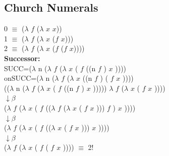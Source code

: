 \documentclass{article}
\begin{document}
\begin{flushleft}
\section*{Church Numerals}
\begin{flushleft} 
 0 $\equiv$ ($\lambda$ $\mathit{f}$ ($\lambda$ $\mathit{x}$ $\mathit{x}$))\\
 1 $\equiv$ ($\lambda$ $\mathit{f}$ ($\lambda$ $\mathit{x}$ ($\mathit{f}$ $\mathit{x}$)))\\
 2 $\equiv$ ($\lambda$ $\mathit{f}$ ($\lambda$ $\mathit{x}$ ($\mathit{f}$ ($\mathit{f}$ $\mathit{x}$))))\\
\bigskip
\textbf{Successor:}\\
SUCC=($\lambda$ n ($\lambda$  $\mathit{f}$  ($\lambda$  $\mathit{x}$  ( $\mathit{f}$  ((n  $\mathit{f}$ )  $\mathit{x}$ ))))\\
onSUCC=($\lambda$ n ($\lambda$  $\mathit{f}$  ($\lambda$  $\mathit{x}$  ((n  $\mathit{f}$ ) ( $\mathit{f}$   $\mathit{x}$ ))))\\
\bigskip
(($\lambda$ n ($\lambda$  $\mathit{f}$  ($\lambda$  $\mathit{x}$  ( $\mathit{f}$  ((n  $\mathit{f}$ )  $\mathit{x}$ ))))) $\lambda$  $\mathit{f}$  ($\lambda$  $\mathit{x}$  ( $\mathit{f}$   $\mathit{x}$ ))))\\
\bigskip
$\downarrow \beta$\\
\bigskip
($\lambda$  $\mathit{f}$  ($\lambda$  $\mathit{x}$  ( $\mathit{f}$  (($\lambda$  $\mathit{f}$  ($\lambda$  $\mathit{x}$  ( $\mathit{f}$   $\mathit{x}$ )))  $\mathit{f}$ )  $\mathit{x}$ ))))\\
\bigskip
$\downarrow \beta$\\
\bigskip
($\lambda$  $\mathit{f}$  ($\lambda$  $\mathit{x}$  ( $\mathit{f}$  (($\lambda$  $\mathit{x}$  ( $\mathit{f}$   $\mathit{x}$ )))  $\mathit{x}$ ))))\\
\bigskip
$\downarrow \beta$\\
\bigskip
($\lambda$  $\mathit{f}$  ($\lambda$  $\mathit{x}$  ( $\mathit{f}$  ( $\mathit{f}$   $\mathit{x}$ )))) $\equiv$ 2!
\end{flushleft}
\end{flushleft}
\bigskip
\end{document}
